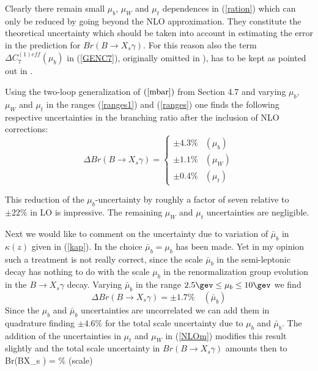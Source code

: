 Clearly there remain small $\mu_b$, $\mu_W$ and $\mu_t$ dependences in
(\ref{ration}) which can only be reduced by going beyond the NLO
approximation. They constitute the theoretical uncertainty which
should be taken into account in estimating the error in the
prediction for $Br(B\to X_s\gamma)$. For this reason also the term
$\Delta C^{(1)eff}_7(\mu_b)$ in (\ref{GENC7}), originally omitted in
\cite{BKP1}), has to be kept as pointed out in \cite{BG98}.

\noindent
Using the two-loop generalization of $(\ref{mbar})$ from Section 4.7
and varying $\mu_b$, $\mu_W$ and $\mu_t$ in the ranges (\ref{ranges1})
and (\ref{ranges}) one
finds \cite{BKP1} the following respective uncertainties in the branching
ratio after the inclusion of NLO corrections:
\begin{equation}\label{NLOm}
\Delta Br(B\to X_s \gamma)=\left\{ \begin{array}{ll}
\pm 4.3\% & (\mu_b) \\
\pm 1.1\% & (\mu_W) \\
\pm 0.4\% & (\mu_t) \end{array} \right.
\end{equation}

This reduction of the $\mu_b$-uncertainty by roughly a factor of seven 
 relative to $\pm 22\%$ in LO is impressive.
The remaining $\mu_W$ and $\mu_t$ uncertainties are negligible.

Next we would like to comment on the uncertainty due to variation of
$\bar\mu_b$ in $\kappa(z)$ given in (\ref{kap}). In \cite{GREUB}
the choice $\bar\mu_b=\mu_b$ has been made. Yet in my opinion
such a treatment is not really correct, since the scale $\bar\mu_b$ in
the semi-leptonic decay has nothing to do with the scale $\mu_b$
in the renormalization group evolution in the $B\to X_s\gamma$
decay. 
Varying $\bar\mu_b$ in the range $2.5\gev\le\mu_b\le 10\gev$ we find
\begin{equation}\label{NLOm1}
\Delta Br(B\to X_s \gamma)=\pm 1.7\% \quad (\bar\mu_b)
\end{equation}
Since the $\mu_b$ and $\bar\mu_b$ uncertainties are uncorrelated we
can add them in quadrature finding $\pm 4.6\%$ for the total
scale uncertainty due to $\mu_b$ and $\bar\mu_b$. 
The addition of the uncertainties in $\mu_t$ and $\mu_W$ in
(\ref{NLOm}) modifies this result slightly and the total scale 
uncertainty in $Br(B \to X_s\gamma)$ amounts then to
\be\label{stheon}
\Delta Br(B{\to}X_s \gamma) = \% \quad({\rm scale})
 \ee


